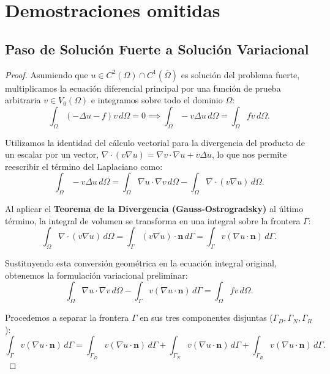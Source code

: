 \documentclass[11pt]{book}
\theoremstyle{plain} %
\theoremstyle{definition} %
\theoremstyle{definition} %
\begin{document}
\section{Demostraciones omitidas}
\subsection{Paso de Solución Fuerte a Solución Variacional}
\label{sec:Paso_Soluciones}

\begin{proof}
    Asumiendo que $u \in C^2(\Omega) \cap C^1(\overline{\Omega})$ es solución del problema fuerte, multiplicamos la ecuación diferencial principal por una función de prueba arbitraria $v \in V_0(\Omega)$ e integramos sobre todo el dominio $\Omega$:
    \begin{equation*}
        \int_{\Omega} (-\Delta u - f) v \, d\Omega = 0 \implies \int_{\Omega} -v \Delta u \, d\Omega = \int_{\Omega} f v \, d\Omega.
    \end{equation*}

    Utilizamos la identidad del cálculo vectorial para la divergencia del producto de un escalar por un vector, $\nabla \cdot (v \nabla u) = \nabla v \cdot \nabla u + v \Delta u$, lo que nos permite reescribir el término del Laplaciano como:
    \begin{equation*}
        \int_{\Omega} -v \Delta u \, d\Omega = \int_{\Omega} \nabla u \cdot \nabla v \, d\Omega - \int_{\Omega} \nabla \cdot (v \nabla u) \, d\Omega.
    \end{equation*}

    Al aplicar el \textbf{Teorema de la Divergencia (Gauss-Ostrogradsky)} al último término, la integral de volumen se transforma en una integral sobre la frontera $\Gamma$:
    \begin{equation*}
        \int_{\Omega} \nabla \cdot (v \nabla u) \, d\Omega = \int_{\Gamma} (v \nabla u) \cdot \mathbf{n} \, d\Gamma = \int_{\Gamma} v (\nabla u \cdot \mathbf{n}) \, d\Gamma.
    \end{equation*}

    Sustituyendo esta conversión geométrica en la ecuación integral original, obtenemos la formulación variacional preliminar:
    \begin{equation*}
        \int_{\Omega} \nabla u \cdot \nabla v \, d\Omega - \int_{\Gamma} v (\nabla u \cdot \mathbf{n}) \, d\Gamma = \int_{\Omega} f v \, d\Omega.
    \end{equation*}

    Procedemos a separar la frontera $\Gamma$ en sus tres componentes disjuntas ($\Gamma_D, \Gamma_N, \Gamma_R$):
    \begin{equation*}
        \int_{\Gamma} v (\nabla u \cdot \mathbf{n}) \, d\Gamma = \int_{\Gamma_D} v (\nabla u \cdot \mathbf{n}) \, d\Gamma + \int_{\Gamma_N} v (\nabla u \cdot \mathbf{n}) \, d\Gamma + \int_{\Gamma_R} v (\nabla u \cdot \mathbf{n}) \, d\Gamma.
    \end{equation*}


\end{proof}
\end{document}
